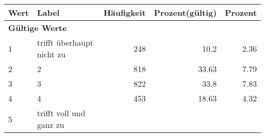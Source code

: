      \begin{longtable}{lXrrr}
     \toprule
     \textbf{Wert} & \textbf{Label} & \textbf{Häufigkeit} & \textbf{Prozent(gültig)} & \textbf{Prozent} \\
     \endhead
     \midrule
     \multicolumn{5}{l}{\textbf{Gültige Werte}}\\

     1 &
     \multicolumn{1}{X}{ trifft überhaupt nicht zu   } &


       \num{248} &
       \num[round-mode=places,round-precision=2]{10.2} &
         \num[round-mode=places,round-precision=2]{2.36} \\

     2 &
     \multicolumn{1}{X}{ 2   } &


       \num{818} &
       \num[round-mode=places,round-precision=2]{33.63} &
         \num[round-mode=places,round-precision=2]{7.79} \\

     3 &
     \multicolumn{1}{X}{ 3   } &


       \num{822} &
       \num[round-mode=places,round-precision=2]{33.8} &
         \num[round-mode=places,round-precision=2]{7.83} \\

     4 &
     \multicolumn{1}{X}{ 4   } &


       \num{453} &
       \num[round-mode=places,round-precision=2]{18.63} &
         \num[round-mode=places,round-precision=2]{4.32} \\

     5 &
     \multicolumn{1}{X}{ trifft voll und ganz zu   } &



\end{longtable}
